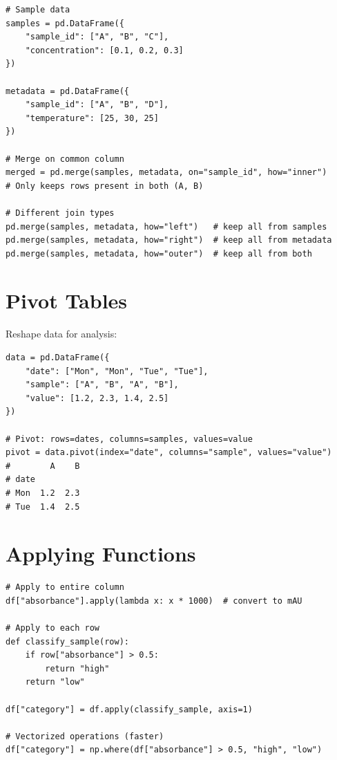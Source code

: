 \begin{lstlisting}
# Sample data
samples = pd.DataFrame({
    "sample_id": ["A", "B", "C"],
    "concentration": [0.1, 0.2, 0.3]
})

metadata = pd.DataFrame({
    "sample_id": ["A", "B", "D"],
    "temperature": [25, 30, 25]
})

# Merge on common column
merged = pd.merge(samples, metadata, on="sample_id", how="inner")
# Only keeps rows present in both (A, B)

# Different join types
pd.merge(samples, metadata, how="left")   # keep all from samples
pd.merge(samples, metadata, how="right")  # keep all from metadata
pd.merge(samples, metadata, how="outer")  # keep all from both
\end{lstlisting}

\section{Pivot Tables}
\label{sec:pivot}

Reshape data for analysis:

\begin{lstlisting}
data = pd.DataFrame({
    "date": ["Mon", "Mon", "Tue", "Tue"],
    "sample": ["A", "B", "A", "B"],
    "value": [1.2, 2.3, 1.4, 2.5]
})

# Pivot: rows=dates, columns=samples, values=value
pivot = data.pivot(index="date", columns="sample", values="value")
#        A    B
# date
# Mon  1.2  2.3
# Tue  1.4  2.5
\end{lstlisting}

\section{Applying Functions}
\label{sec:applying}

\begin{lstlisting}
# Apply to entire column
df["absorbance"].apply(lambda x: x * 1000)  # convert to mAU

# Apply to each row
def classify_sample(row):
    if row["absorbance"] > 0.5:
        return "high"
    return "low"

df["category"] = df.apply(classify_sample, axis=1)

# Vectorized operations (faster)
df["category"] = np.where(df["absorbance"] > 0.5, "high", "low")
\end{lstlisting}


